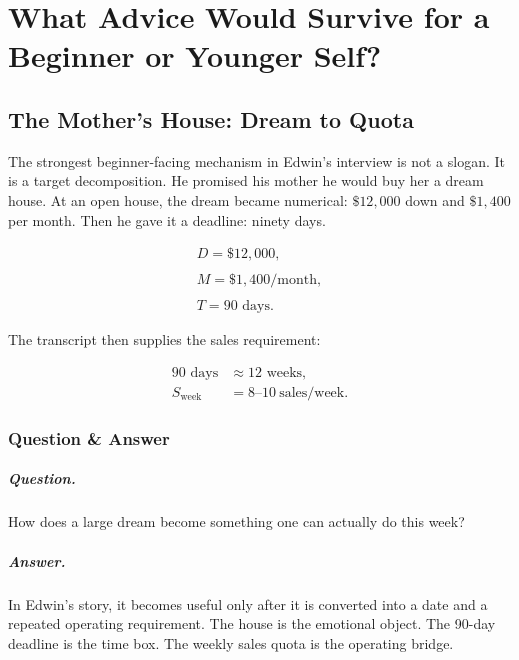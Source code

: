 \documentclass[11pt,oneside]{book}
\begin{document}
\chapter{What Advice Would Survive for a Beginner or Younger Self?}

\section{The Mother's House: Dream to Quota}

The strongest beginner-facing mechanism in Edwin's interview is not a slogan. It is a target decomposition. He promised his mother he would buy her a dream house. At an open house, the dream became numerical: \(\$12{,}000\) down and \(\$1{,}400\) per month. Then he gave it a deadline: ninety days.

\begin{equation}
\begin{gathered}
D=\$12{,}000,\\
\qquad\\
M=\$1{,}400/\text{month},\\
\qquad\\
T=90\text{ days}.
\end{gathered}
\end{equation}

The transcript then supplies the sales requirement:

\begin{align}
90\text{ days} &\approx 12\text{ weeks},\\
S_{\mathrm{week}} &= 8\text{--}10\ \text{sales/week}.
\end{align}

\subsection{Question \& Answer}

\paragraph{Question.}
How does a large dream become something one can actually do this week?

\paragraph{Answer.}
In Edwin's story, it becomes useful only after it is converted into a date and a repeated operating requirement. The house is the emotional object. The 90-day deadline is the time box. The weekly sales quota is the operating bridge.
\end{document}
